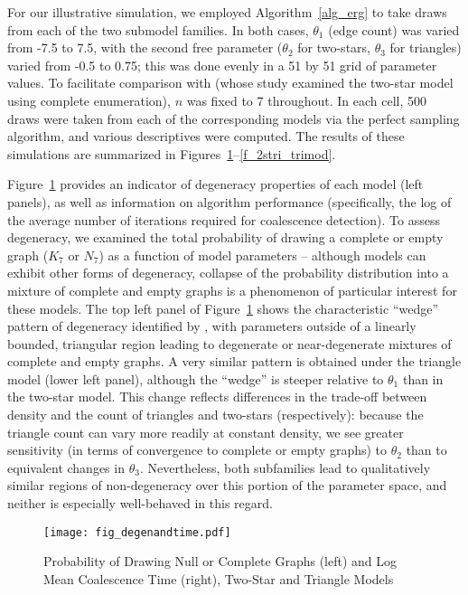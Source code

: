 \documentclass[11pt]{article}
\begin{document}
For our illustrative simulation, we employed Algorithm~\ref{alg_erg} to take draws from each of the two submodel families.  In both cases, $\theta_1$ (edge count) was varied from -7.5 to 7.5, with the second free parameter ($\theta_2$ for two-stars, $\theta_3$ for triangles) varied from -0.5 to 0.75; this was done evenly in a 51 by 51 grid of parameter values.  To facilitate comparison with \citet{handcock:ch:2003} (whose study examined the two-star model using complete enumeration), $n$ was fixed to 7 throughout.  In each cell, 500 draws were taken from each of the corresponding models via the perfect sampling algorithm, and various descriptives were computed.  The results of these simulations are summarized in Figures~\ref{f_degandtime}--\ref{f_2stri_trimod}.  

Figure~\ref{f_degandtime} provides an indicator of degeneracy properties of each model (left panels), as well as information on algorithm performance (specifically, the log of the average number of iterations required for coalescence detection).  To assess degeneracy, we examined the total probability of drawing a complete or empty graph ($K_7$ or $N_7$) as a function of model parameters -- although models can exhibit other forms of degeneracy, collapse of the probability distribution into a mixture of complete and empty graphs is a phenomenon of particular interest for these models.  The top left panel of Figure~\ref{f_degandtime} shows the characteristic ``wedge'' pattern of degeneracy identified by \citet{handcock:ch:2003}, with parameters outside of a linearly bounded, triangular region leading to degenerate or near-degenerate mixtures of complete and empty graphs.   A very similar pattern is obtained under the triangle model (lower left panel), although the ``wedge'' is steeper relative to $\theta_1$ than in the two-star model.  This change reflects differences in the trade-off between density and the count of triangles and two-stars (respectively): because the triangle count can vary more readily at constant density, we see greater sensitivity (in terms of convergence to complete or empty graphs) to $\theta_2$ than to equivalent changes in $\theta_3$.  Nevertheless, both subfamilies lead to qualitatively similar regions of non-degeneracy over this portion of the parameter space, and neither is especially well-behaved in this regard.

\begin{figure}
\begin{center}
\texttt{[image: fig\_degenandtime.pdf]}
\caption{\label{f_degandtime} Probability of Drawing Null or Complete Graphs (left) and Log Mean Coalescence Time (right), Two-Star and Triangle Models}
\end{center}
\end{figure}
\end{document}
